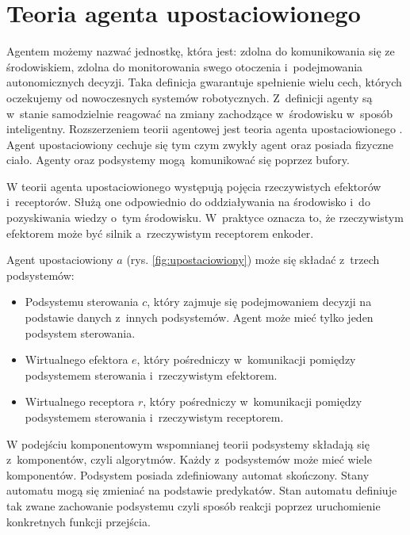 \section{Teoria agenta upostaciowionego}
Agentem możemy nazwać jednostkę, która jest: zdolna do komunikowania się ze środowiskiem, zdolna do monitorowania swego otoczenia i~podejmowania autonomicznych decyzji. Taka definicja gwarantuje spełnienie wielu cech, których oczekujemy od nowoczesnych systemów robotycznych. Z~definicji agenty są w~stanie samodzielnie reagować na zmiany zachodzące w~środowisku w~sposób inteligentny. Rozszerzeniem teorii agentowej jest teoria agenta upostaciowionego \cite{bib:agent1} \cite{bib:agent2}. Agent upostaciowiony cechuje się tym czym zwykły agent oraz posiada fizyczne ciało. Agenty oraz podsystemy mogą komunikować się poprzez bufory.


W teorii agenta upostaciowionego występują pojęcia rzeczywistych efektorów i~receptorów. Służą one odpowiednio do oddziaływania na środowisko i~do pozyskiwania wiedzy o~tym środowisku. W~praktyce oznacza to, że rzeczywistym efektorem może być silnik a~rzeczywistym receptorem enkoder. 

Agent upostaciowiony $a$  (rys. \ref{fig:upostaciowiony}) może się składać z~trzech podsystemów:
\begin{itemize}
	\item Podsystemu sterowania $c$, który zajmuje się podejmowaniem decyzji na podstawie danych z~innych podsystemów. Agent może mieć tylko jeden podsystem sterowania.
	\item Wirtualnego efektora $e$, który pośredniczy w~komunikacji pomiędzy podsystemem sterowania i~rzeczywistym efektorem.
	\item Wirtualnego receptora $r$, który pośredniczy w~komunikacji pomiędzy podsystemem sterowania i~rzeczywistym receptorem.
\end{itemize}

W podejściu komponentowym wspomnianej teorii podsystemy składają się z~komponentów, czyli algorytmów. Każdy z~podsystemów może mieć wiele komponentów. Podsystem posiada zdefiniowany automat skończony. Stany automatu mogą się zmieniać na podstawie predykatów. Stan automatu definiuje tak zwane zachowanie podsystemu czyli sposób reakcji poprzez uruchomienie konkretnych funkcji przejścia. 

